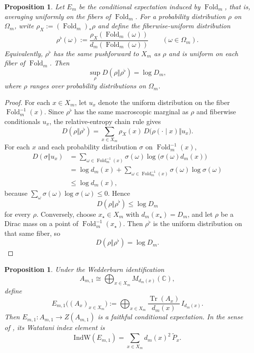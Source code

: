 \documentclass[12pt,a4paper]{article}
\theoremstyle{plain}
\newtheorem{proposition}[theorem]{Proposition}
\theoremstyle{definition}
\numberwithin{equation}{section}
\DeclareMathOperator{\Tr}{Tr}
\newcommand{\CC}{\mathbb{C}}
\newcommand{\Fold}{\operatorname{Fold}}
\begin{document}
\begin{proposition}\label{prop:fold-condexp-index-maxfiber}
Let \(E_m\) be the conditional expectation induced by \(\Fold_m\), that is, averaging uniformly on the fibers of \(\Fold_m\). For a probability distribution \(\rho\) on \(\Omega_m\), write \(\rho_X:=(\Fold_m)_\ast\rho\) and define the fiberwise-uniform distribution
\[
\rho^\flat(\omega):=\frac{\rho_X(\Fold_m(\omega))}{d_m(\Fold_m(\omega))}
\qquad(\omega\in \Omega_m).
\]
Equivalently, \(\rho^\flat\) has the same pushforward to \(X_m\) as \(\rho\) and is uniform on each fiber of \(\Fold_m\). Then
\[
\sup_{\rho}D(\rho\Vert \rho^\flat)=\log D_m,
\]
where \(\rho\) ranges over probability distributions on \(\Omega_m\).
\end{proposition}

\begin{proof}
For each \(x\in X_m\), let \(u_x\) denote the uniform distribution on the fiber \(\Fold_m^{-1}(x)\). Since \(\rho^\flat\) has the same macroscopic marginal as \(\rho\) and fiberwise conditionals \(u_x\), the relative-entropy chain rule gives
\[
D(\rho\Vert \rho^\flat)
=
\sum_{x\in X_m}\rho_X(x)\,
D\!\bigl(\rho(\cdot\mid x)\Vert u_x\bigr).
\]
For each \(x\) and each probability distribution \(\sigma\) on \(\Fold_m^{-1}(x)\),
\[
\begin{aligned}
D(\sigma\Vert u_x)
&=
\sum_{\omega\in\Fold_m^{-1}(x)}\sigma(\omega)\log\!\bigl(\sigma(\omega)d_m(x)\bigr)\\
&=
\log d_m(x)+\sum_{\omega\in\Fold_m^{-1}(x)}\sigma(\omega)\log \sigma(\omega)\\
&\le
\log d_m(x),
\end{aligned}
\]
because \(\sum_\omega \sigma(\omega)\log \sigma(\omega)\le 0\). Hence
\[
D(\rho\Vert \rho^\flat)\le \log D_m
\]
for every \(\rho\). Conversely, choose \(x_\star\in X_m\) with \(d_m(x_\star)=D_m\), and let \(\rho\) be a Dirac mass on a point of \(\Fold_m^{-1}(x_\star)\). Then \(\rho^\flat\) is the uniform distribution on that same fiber, so
\[
D(\rho\Vert \rho^\flat)=\log D_m.
\]
\end{proof}

\begin{proposition}\label{prop:fold-groupoid-block-expectation}
Under the Wedderburn identification
\[
A_{m,1}\cong \bigoplus_{x\in X_m}M_{d_m(x)}(\CC),
\]
define
\[
E_{m,1}\bigl((A_x)_{x\in X_m}\bigr)
:=
\bigoplus_{x\in X_m}\frac{\Tr(A_x)}{d_m(x)}\,I_{d_m(x)}.
\]
Then \(E_{m,1}:A_{m,1}\to Z(A_{m,1})\) is a faithful conditional expectation. In the sense of \cite{Watatani1990}, its Watatani index element is
\[
\mathrm{IndW}(E_{m,1})=\sum_{x\in X_m}d_m(x)^2\,\widetilde P_x.
\]
\end{proposition}
\end{document}
